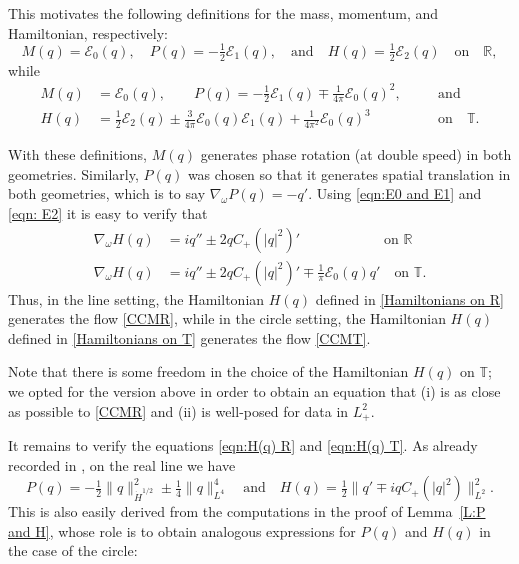 \documentclass{amsart}
\numberwithin{equation}{section}
\theoremstyle{definition}
\newcommand{\om}{\omega}
\newcommand{\R}{\mathbb{R}}
\newcommand{\T}{\mathbb{T}}
\newcommand{\na}{\nabla}
\newcommand{\qtq}[1]{\quad\text{#1}\quad}
\begin{document}
This motivates the following definitions for the mass, momentum, and Hamiltonian, respectively:
\begin{equation}\label{Hamiltonians on R}
M(q)=\mathcal{E}_0(q), \quad P(q)=-\tfrac12\mathcal{E}_1(q), \qtq{and}  H(q)=\tfrac12\mathcal{E}_2(q) \qtq{on} \R,
\end{equation}
while
\begin{equation}\label{Hamiltonians on T}
\begin{alignedat}{2}
M(q)&=\mathcal{E}_0(q), \qquad  P(q)=-\tfrac12\mathcal{E}_1(q)\mp\tfrac1{4\pi}\mathcal{E}_0(q)^2, \quad&&\text{and}\\
H(q)&=\tfrac12\mathcal{E}_2(q)\pm\tfrac{3}{4\pi}\mathcal{E}_0(q)\mathcal{E}_1(q)+\tfrac{1}{4\pi^2}\mathcal{E}_0(q)^3 &&\text{on}\quad \T. 
\end{alignedat}
\end{equation}

With these definitions, $M(q)$ generates phase rotation (at double speed) in both geometries.  Similarly, $P(q)$ was chosen so that it generates spatial translation in both geometries, which is to say $\na_\om P(q) = -q'$. Using \eqref{eqn:E0 and E1} and \eqref{eqn: E2} it is easy to  verify that
\begin{equation}\label{5:09}
\begin{aligned}
\na_\om H(q) &= iq''\pm 2qC_+(|q|^2)'\qquad \qquad \quad \quad\text{on $\R$}\\
\na_\om H(q) &= iq''\pm 2qC_+(|q|^2)'\mp\tfrac{1}{\pi}\mathcal E_0(q) q' \quad\text{on $\T$}.
\end{aligned}
\end{equation}
Thus, in the line setting, the Hamiltonian $H(q)$ defined in \eqref{Hamiltonians on R} generates the flow \eqref{CCMR}, while in the circle setting, the Hamiltonian $H(q)$ defined in \eqref{Hamiltonians on T} generates the flow \eqref{CCMT}.

Note that there is some freedom in the choice of the Hamiltonian $H(q)$ on $\T$; we opted for the version above in order to obtain an equation that (i) is as close as possible to \eqref{CCMR} and (ii) is well-posed for data in $L^2_+$.

It remains to verify the equations \eqref{eqn:H(q) R} and \eqref{eqn:H(q) T}. As already recorded in \cite{gerard2024calogero}, on the real line we have
$$
P(q) =-\tfrac12\|q\|_{\dot H^{1/2}}^2\pm \tfrac14\|q\|_{L^4}^4 \qtq{and} H(q)=\tfrac12\|q'\mp i qC_+(|q|^2)\|_{L^2}^2.
$$
This is also easily derived from the computations in the proof of Lemma~\ref{L:P and H}, whose role is to obtain analogous expressions for $P(q)$ and $H(q)$ in the case of the circle:
\end{document}
